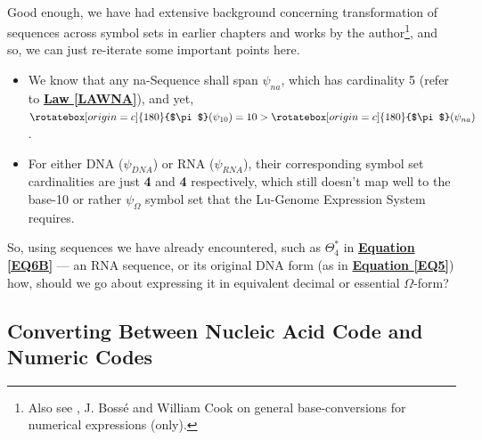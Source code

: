 \documentclass[a4paper, 18pt]{book} %
\newcommand{\invpi}{\rotatebox[origin=c]{180}{$\pi$}}
\begin{document}
\vspace{2em}
\\
\vspace{2em}


Good enough, we have had extensive background concerning transformation of sequences across symbol sets in earlier chapters and works by the author\cite{base36paper}\cite{lnspaper}\footnote{Also see \cite{bosse2025repeating}, J. Bossé and William Cook on general base-conversions for numerical expressions (only).}, and so, we can just re-iterate some important points here.

\begin{itemize}
\item We know that any na-Sequence shall span $\psi_{na}$, which has cardinality 5 (refer to \textbf{\hyperref[LAWNA]{Law \ref{LAWNA}}}), and yet, $\invpi(\psi_{10}) = 10 > \invpi(\psi_{na})$.
\item For either DNA ($\psi_{DNA}$) or RNA ($\psi_{RNA}$), their corresponding symbol set cardinalities are just \textbf{4} and \textbf{4} respectively, which still doesn't map well to the base-10 or rather $\psi_{\Omega}$ symbol set that the Lu-Genome Expression System requires.
\end{itemize}

So, using sequences we have already encountered, such as $\Theta_4^*$ in \textbf{\hyperref[EQ6B]{Equation \ref{EQ6B}}} --- an RNA sequence, or its original DNA form (as in \textbf{\hyperref[EQ5]{Equation \ref{EQ5}}}) how, should we go about expressing it in equivalent decimal or essential $\Omega$-form?


\subsection{Converting Between Nucleic Acid Code and Numeric Codes}
\end{document}
